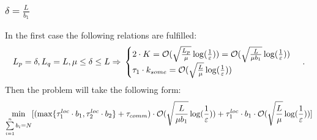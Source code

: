 \documentclass{article}
\begin{document}
\subsubsection{$\delta = \frac{L}{b_1}$}
In the first case the following relations are fulfilled:
\begin{equation}
    \notag
    L_p = \delta, L_q = L, \mu \leq \delta \leq L \Rightarrow 
    \\
    \notag
    \begin{cases}
      2\cdot K = \mathcal O(\sqrt{\frac{L_p}{\mu}}\log(\frac{1}{\varepsilon}))  = \mathcal O(\sqrt{\frac{L}{\mu b_1}}\log(\frac{1}{\varepsilon}))\\
      \tau_1\cdot k_{some} = \mathcal O(\sqrt{\frac{L}{\mu}}\log(\frac{1}{\varepsilon}))
    \end{cases}\,.
\end{equation}
Then the problem will take the following form:
\begin{equation}
    \notag
    \underset{\sum\limits_{i = 1}^{n} b_i = N}{\min}[(\max\{\tau_1^{loc}\cdot b_1, \tau_2^{loc}\cdot b_2\} + \tau_{comm}) \cdot \mathcal O(\sqrt{\frac{L}{\mu {b_1}}}\log(\frac{1}{\varepsilon})) + \tau_1^{loc}\cdot b_1 \cdot \mathcal O(\sqrt{\frac{L}{\mu}}\log(\frac{1}{\varepsilon}))]
\end{equation}
\end{document}
